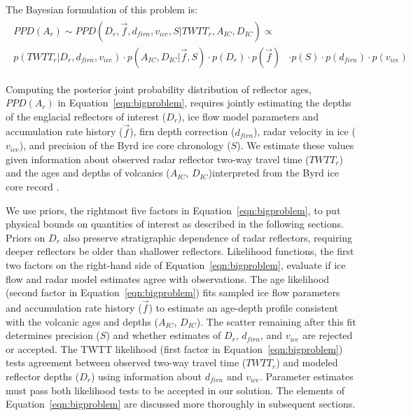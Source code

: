 The Bayesian formulation of this problem is:
\begin{equation}\label{eqn:bigproblem}
\begin{split} %
\begin{aligned}
PPD(A_r)  \sim  PPD(D_r,\vec{f},d_{firn},v_{ice},S | TWTT_r,A_{IC},D_{IC})  \propto & \\
        p(TWTT_r | D_r,d_{firn},v_{ice}) \cdot p(A_{IC},D_{IC} | \vec{f},S)  \cdot p(D_r) \cdot p(\vec{f}) &\cdot p(S) \cdot p(d_{firn})\cdot p(v_{ice})
\end{aligned}
\end{split}
\end{equation}

Computing the posterior joint probability distribution of reflector ages, $PPD(A_r)$ in Equation~\ref{eqn:bigproblem}, requires jointly estimating the depths of the englacial reflectors of interest ($D_r$), ice flow model parameters and accumulation rate history ($\vec{f}$), firn depth correction ($d_{firn}$), radar velocity in ice ($v_{ice}$), and precision of the Byrd ice core chronology ($S$). We estimate these values given information about observed radar reflector two-way travel time ($TWTT_r$) and the ages and depths of volcanics ($A_{IC}$, $D_{IC}$)interpreted from the Byrd ice core record \citep{hammer1997}.


We use priors, the rightmost five factors in Equation~\ref{eqn:bigproblem}, to put physical bounds on quantities of interest as described in the following sections. Priors on ${D_r}$ also preserve stratigraphic dependence of radar reflectors, requiring deeper reflectors be older than shallower reflectors. Likelihood functions, the first two factors on the right-hand side of Equation~\ref{eqn:bigproblem}, evaluate if ice flow and radar model estimates agree with observations. The age likelihood (second factor in Equation~\ref{eqn:bigproblem}) fits sampled ice flow parameters and accumulation rate history ($\vec{f}$) to estimate an age-depth profile consistent with the volcanic ages and depths ($A_{IC}$, $D_{IC}$). The scatter remaining after this fit determines precision ($S$) and whether estimates of $D_r$, $d_{firn}$, and $v_{ice}$ are rejected or accepted. The TWTT likelihood (first factor in Equation~\ref{eqn:bigproblem}) tests %
agreement between observed two-way travel time ($TWTT_r$) and modeled reflector depths ($D_r$) using information about $d_{firn}$ and $v_{ice}$. Parameter estimates must pass both likelihood tests to be accepted in our solution. The elements of Equation~\ref{eqn:bigproblem} are discussed more thoroughly in subsequent sections. %

